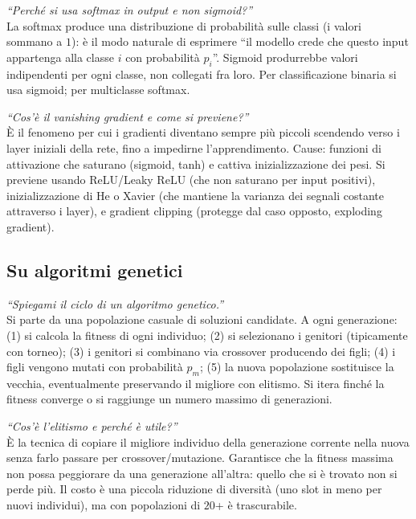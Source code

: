\documentclass[11pt,a4paper]{article}
\begin{document}
\begin{domanda}
\textit{``Perché si usa softmax in output e non sigmoid?''}\\
La softmax produce una distribuzione di probabilità sulle classi (i
valori sommano a $1$): è il modo naturale di esprimere ``il modello
crede che questo input appartenga alla classe $i$ con probabilità $p_i$''.
Sigmoid produrrebbe valori indipendenti per ogni classe, non collegati
fra loro. Per classificazione binaria si usa sigmoid; per multiclasse
softmax.
\end{domanda}

\begin{domanda}
\textit{``Cos'è il vanishing gradient e come si previene?''}\\
È il fenomeno per cui i gradienti diventano sempre più piccoli scendendo
verso i layer iniziali della rete, fino a impedirne l'apprendimento.
Cause: funzioni di attivazione che saturano (sigmoid, tanh) e cattiva
inizializzazione dei pesi. Si previene usando ReLU/Leaky ReLU (che non
saturano per input positivi), inizializzazione di He o Xavier (che
mantiene la varianza dei segnali costante attraverso i layer), e
gradient clipping (protegge dal caso opposto, exploding gradient).
\end{domanda}

\subsection{Su algoritmi genetici}

\begin{domanda}
\textit{``Spiegami il ciclo di un algoritmo genetico.''}\\
Si parte da una popolazione casuale di soluzioni candidate. A ogni
generazione: (1) si calcola la fitness di ogni individuo; (2) si
selezionano i genitori (tipicamente con torneo); (3) i genitori si
combinano via crossover producendo dei figli; (4) i figli vengono
mutati con probabilità $p_m$; (5) la nuova popolazione sostituisce la
vecchia, eventualmente preservando il migliore con elitismo. Si itera
finché la fitness converge o si raggiunge un numero massimo di
generazioni.
\end{domanda}

\begin{domanda}
\textit{``Cos'è l'elitismo e perché è utile?''}\\
È la tecnica di copiare il migliore individuo della generazione corrente
nella nuova senza farlo passare per crossover/mutazione. Garantisce che
la fitness massima non possa peggiorare da una generazione all'altra:
quello che si è trovato non si perde più. Il costo è una piccola
riduzione di diversità (uno slot in meno per nuovi individui), ma con
popolazioni di $20$+ è trascurabile.
\end{domanda}
\end{document}
